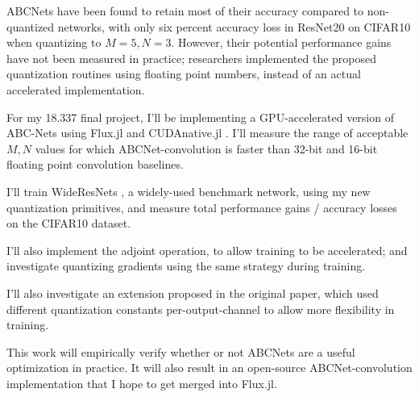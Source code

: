 \documentclass[11pt]{article}
\begin{document}
ABCNets have been found to retain most of their accuracy compared to non-quantized networks,
with only six percent accuracy loss
in ResNet20 on CIFAR10 when quantizing to \(M=5,N=3\). However, their potential performance
gains have not been measured in practice; researchers implemented the proposed quantization
routines using floating point numbers, instead of an actual accelerated implementation.

For my 18.337 final project, I'll be implementing a GPU-accelerated version of ABC-Nets
using Flux.jl and CUDAnative.jl \citep{FluxJL}\citep{CUDAnativeJL}. I'll measure the
range of acceptable \(M,N\) values for which ABCNet-convolution is faster than
32-bit and 16-bit floating point convolution baselines.

I'll train WideResNets \cite{WideResNets}, a widely-used benchmark network,
using my new quantization primitives, and measure total performance gains / accuracy losses
on the CIFAR10 dataset.

I'll also implement the adjoint operation, to allow training to be accelerated;
and investigate quantizing gradients using the same strategy during training.

I'll also investigate an extension proposed in the original paper, which used different
quantization constants per-output-channel to allow more flexibility in training.

This work will empirically verify whether or not ABCNets are a useful optimization in
practice. It will also result in an open-source ABCNet-convolution implementation that
I hope to get merged into Flux.jl.








\end{document}
